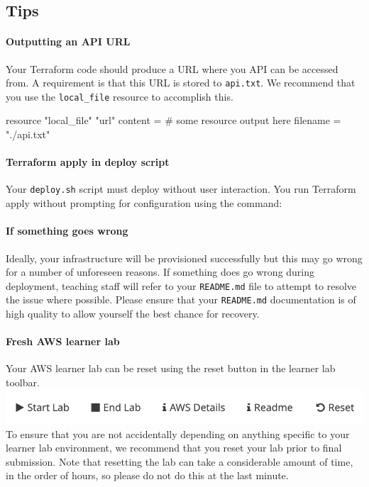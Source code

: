 \documentclass{csse4400}
\begin{document}
\subsection{Tips}

\paragraph{Outputting an API URL}
Your Terraform code should produce a URL where you API can be accessed from.
A requirement is that this URL is stored to \texttt{api.txt}.
We recommend that you use the \texttt{local\_file} resource to accomplish this.

\begin{code}[language=terraform]{}
resource "local_file" "url" {
    content  = # some resource output here
    filename = "./api.txt"
}
\end{code}

\paragraph{Terraform apply in deploy script}
Your \texttt{deploy.sh} script must deploy without user interaction.
You run Terraform apply without prompting for configuration using the command:

\paragraph{If something goes wrong}
Ideally, your infrastructure will be provisioned successfully but this may go wrong for a number of unforeseen reasons.
If something does go wrong during deployment,
teaching staff will refer to your \texttt{README.md} file to attempt to resolve the issue where possible.
Please ensure that your \texttt{README.md} documentation is of high quality to allow yourself the best chance for recovery.

\paragraph{Fresh AWS learner lab}
Your AWS learner lab can be reset using the reset button in the learner lab toolbar.
\includegraphics[width=\textwidth]{images/reset-button.png}
To ensure that you are not accidentally depending on anything specific to your learner lab environment,
we recommend that you reset your lab prior to final submission.
Note that resetting the lab can take a considerable amount of time,
in the order of hours,
so please do not do this at the last minute.
\end{document}
